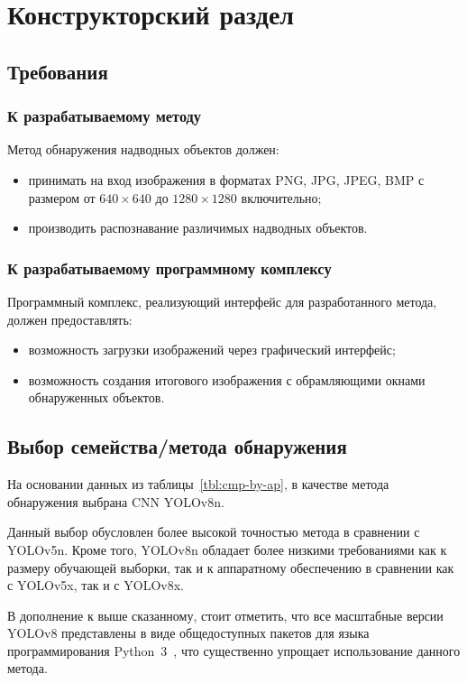 \chapter{Конструкторский раздел}

\section{Требования}

\subsection*{К разрабатываемому методу}
Метод обнаружения надводных объектов должен:
\begin{itemize}[label=---]
    \item принимать на вход изображения в форматах PNG, JPG, JPEG, BMP с размером от $640 \times 640$ до $1280 \times 1280$ включительно;
    \item производить распознавание различимых надводных объектов.
\end{itemize}

\subsection*{К разрабатываемому программному комплексу}

Программный комплекс, реализующий интерфейс для разработанного метода, должен предоставлять:
\begin{itemize}[label=---]
    \item возможность загрузки изображений через графический интерфейс;
    \item возможность создания итогового изображения с обрамляющими окнами обнаруженных объектов.
\end{itemize}

\section{Выбор семейства/метода обнаружения}

На основании данных из таблицы~\ref{tbl:cmp-by-ap}, в качестве метода обнаружения выбрана CNN YOLOv8n.

Данный выбор обусловлен более высокой точностью метода в сравнении с YOLOv5n. Кроме того, YOLOv8n обладает более низкими требованиями как к размеру обучающей выборки, так и к аппаратному обеспечению в сравнении как с YOLOv5x, так и с YOLOv8x.

В дополнение к выше сказанному, стоит отметить, что все масштабные версии YOLOv8 представлены в виде общедоступных пакетов для языка программирования Python~3~\cite{python3}, что существенно упрощает использование данного метода.

